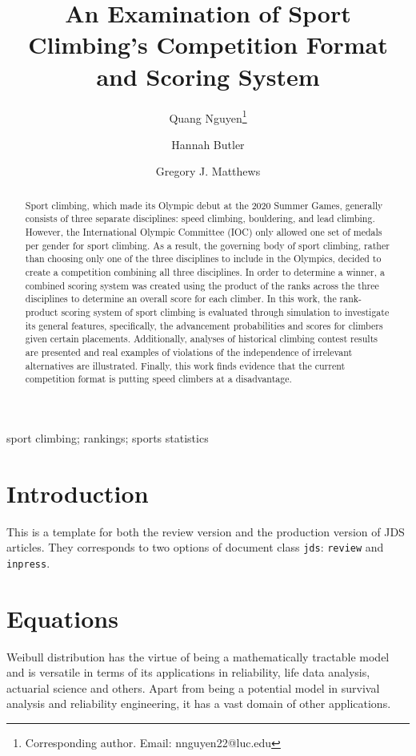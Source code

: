 \documentclass[letterpaper, inpress]{jds} %
\title[Sport Climbing's Competition Format and Scoring System]{An Examination of Sport Climbing's Competition Format and Scoring System}
\author[1]{Quang Nguyen\footnote{Corresponding author. Email: nnguyen22@luc.edu}}
\author[2]{Hannah Butler}
\author[1]{Gregory J. Matthews}
\affil[1]{Department of Mathematics and Statistics, Loyola University Chicago, Chicago, IL, USA}
\affil[2]{Department of Statistics, Colorado State University, Fort Collins, CO, USA}
\begin{document}
\maketitle

\begin{abstract}
Sport climbing, which made its Olympic debut at the 2020 Summer Games, generally consists of three separate disciplines: speed climbing, bouldering, and lead climbing. However, the International Olympic Committee (IOC) only allowed one set of medals per gender for sport climbing. As a result, the governing body of sport climbing, rather than choosing only one of the three disciplines to include in the Olympics, decided to create a competition combining all three disciplines. In order to determine a winner, a combined scoring system was created using the product of the ranks across the three disciplines to determine an overall score for each climber. In this work, the rank-product scoring system of sport climbing is evaluated through simulation to investigate its general features, specifically, the advancement probabilities and scores for climbers given certain placements. Additionally, analyses of historical climbing contest results are presented and real examples of violations of the independence of irrelevant alternatives are illustrated. Finally, this work finds evidence that the current competition format is putting speed climbers at a disadvantage.\@
\end{abstract}

\begin{keywords} %
sport climbing; rankings; sports statistics
\end{keywords}

\section{Introduction}%
\label{sec:intro}

This is a template for both the review version and the production
version of JDS articles. They corresponds to two options of document
class \texttt{jds}: \texttt{review} and \texttt{inpress}.


\lipsum[1-2]


\section{Equations}%
\label{sec:eq}


Weibull distribution has the virtue of being a mathematically tractable model
and is versatile in terms of its applications in reliability, life data
analysis, actuarial science and others. Apart from being a potential model in
survival analysis and reliability engineering, it has a vast domain of other
applications.
\end{document}
